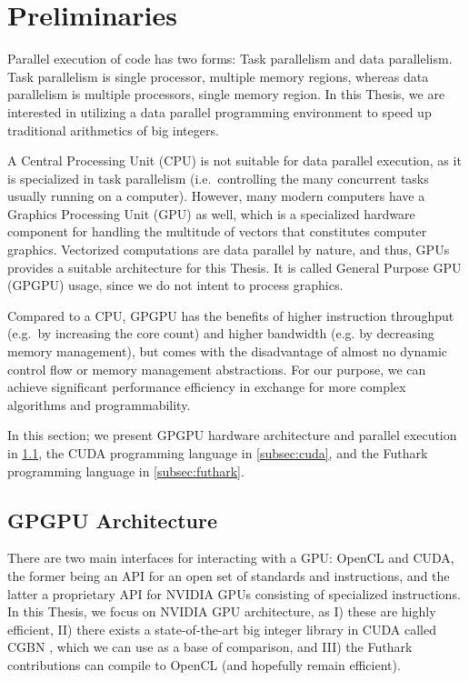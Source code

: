 \section{Preliminaries}
\label{sec:pre}
Parallel execution of code has two forms: Task parallelism and data
parallelism. Task parallelism is single processor, multiple memory regions,
whereas data parallelism is multiple processors, single memory region. In this
Thesis, we are interested in utilizing a data parallel programming environment
to speed up traditional arithmetics of big integers.

A Central Processing Unit (CPU) is not suitable for data parallel execution, as
it is specialized in task parallelism (i.e.\ controlling the many concurrent
tasks usually running on a computer). However, many modern computers have a
Graphics Processing Unit (GPU) as well, which is a specialized hardware
component for handling the multitude of vectors that constitutes computer
graphics.  Vectorized computations are data parallel by nature, and thus, GPUs
provides a suitable architecture for this Thesis. It is called General Purpose
GPU (GPGPU) usage, since we do not intent to process graphics.

Compared to a CPU, GPGPU has the benefits of higher instruction throughput
(e.g.\ by increasing the core count) and higher bandwidth (e.g. by decreasing
memory management), but comes with the disadvantage of almost no dynamic control
flow or memory management abstractions. For our purpose, we can achieve
significant performance efficiency in exchange for more complex algorithms and
programmability.

In this section; we present GPGPU hardware architecture and parallel execution
in \ref{subsec:gpgpu}, the CUDA programming language in \ref{subsec:cuda}, and
the Futhark programming language in \ref{subsec:futhark}.

\subsection{GPGPU Architecture}
\label{subsec:gpgpu}

There are two main interfaces for interacting with a GPU: OpenCL and CUDA, the
former being an API for an open set of standards and instructions, and the latter
a proprietary API for NVIDIA GPUs consisting of specialized instructions. In
this Thesis, we focus on NVIDIA GPU architecture, as I) these are highly
efficient, II) there exists a state-of-the-art big integer library in CUDA
called CGBN \cite{CGBN}, which we can use as a base of comparison, and III) the
Futhark contributions can compile to OpenCL (and hopefully remain efficient).

